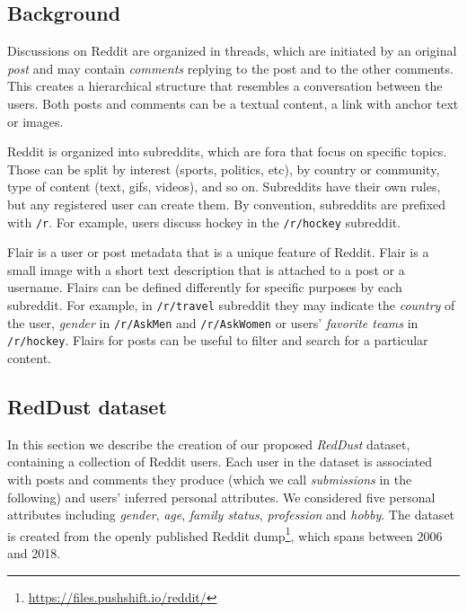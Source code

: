 \subsection{Background}


Discussions on Reddit are organized in threads, which are initiated by an original \textit{post} and may contain \textit{comments} replying to the post and to the other comments. This creates a hierarchical structure that resembles a conversation between the users.
Both posts and comments can be a textual content, a link with anchor text or images.

Reddit is organized into subreddits, which are fora that focus on specific topics.
Those can be split by interest (sports, politics, etc), by country or community, type of content (text, gifs, videos), and so on. Subreddits have their own rules, but any registered user can create them. By convention, subreddits are prefixed with \texttt{\small /r}. For example, users discuss hockey in the \texttt{\small /r/hockey} subreddit.

Flair is a user or post metadata that is a unique feature of Reddit. Flair is a small image with a short text description that is attached to a post or a username. Flairs can be defined differently for specific purposes by each subreddit. For example, in \texttt{\small /r/travel} subreddit they may indicate the \textit{country} of the user, \textit{gender} in \texttt{\small /r/AskMen} and \texttt{\small /r/AskWomen} or users' \textit{favorite teams} in \texttt{\small /r/hockey}.
Flairs for posts can be useful to filter and search for a particular content.

\subsection{RedDust dataset}

In this section we describe the creation of our proposed \emph{RedDust} dataset, containing a collection of Reddit users. Each user in the dataset is associated with posts and comments they produce (which we call \textit{submissions} in the following) and users' inferred personal attributes.
We considered five personal attributes including \textit{gender}, \textit{age}, \textit{family status}, \textit{profession} and \textit{hobby}.
The dataset is created from the openly published Reddit dump\footnote{{\scriptsize \url{https://files.pushshift.io/reddit/}}}, which spans between 2006 and 2018. 

